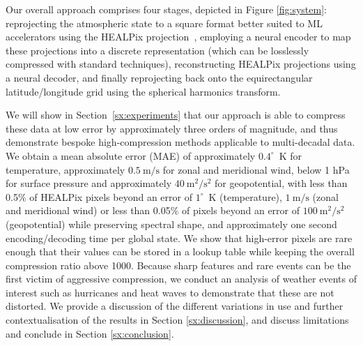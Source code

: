 

Our overall approach comprises four stages, depicted in Figure \ref{fig:system}: reprojecting the atmospheric state to a square format better suited to ML accelerators using the HEALPix projection~\citep{gorski1999healpix}, employing a neural encoder to map these projections into a discrete representation (which can be losslessly compressed with standard techniques), reconstructing HEALPix projections using a neural decoder, and finally reprojecting back onto the equirectangular latitude/longitude grid using the spherical harmonics transform.



We will show in Section~\ref{sx:experiments} that our approach is able to compress these data at low error by approximately three orders of magnitude, and thus demonstrate bespoke high-compression methods applicable to multi-decadal data.
We obtain a mean absolute error (MAE) of approximately $0.4^\circ$~K for temperature, approximately $0.5~\text{m}/\text{s}$ for zonal and meridional wind, below 1 hPa for surface pressure and approximately $40~\text{m}^2/\text{s}^2$ for geopotential, with less than 0.5\% of HEALPix pixels beyond an error of $1^\circ$~K (temperature), $1~\text{m}/\text{s}$ (zonal and meridional wind) or less than 0.05\% of pixels beyond an error of $100~\text{m}^2/\text{s}^2$ (geopotential) while preserving spectral shape, and approximately one second encoding/decoding time per global state. 
We show that high-error pixels are rare enough that their values can be stored in a lookup table while keeping the overall compression ratio above 1000.
Because sharp features and rare events can be the first victim of aggressive compression, we conduct an analysis of weather events of interest such as hurricanes and heat waves to demonstrate that these are not distorted.
We provide a discussion of the different variations in use and further contextualisation of the results in Section \ref{sx:discussion}, and discuss limitations and conclude in Section \ref{sx:conclusion}.

